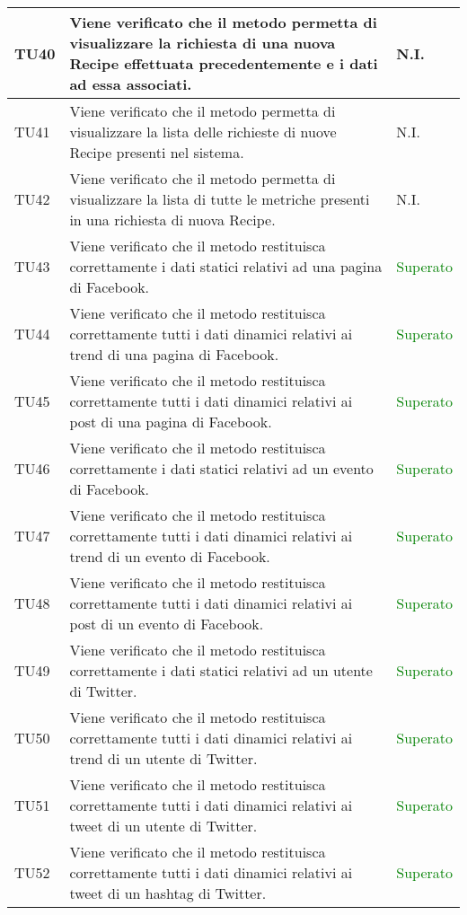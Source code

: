 \begin{center}
\begin{longtable}{| p{2cm} | p{8cm} | p{2.5cm} |}
					TU40 & Viene verificato che il metodo permetta di visualizzare la richiesta di una nuova Recipe effettuata precedentemente e i dati ad essa associati. & N.I.\\
					\hline
					TU41 & Viene verificato che il metodo permetta di visualizzare la lista delle richieste di nuove Recipe presenti nel sistema. & N.I.\\
					\hline
					TU42 & Viene verificato che il metodo permetta di visualizzare la lista di tutte le metriche presenti in una richiesta di nuova Recipe. & N.I.\\
					\hline
					TU43 & Viene verificato che il metodo restituisca correttamente i dati statici relativi ad una pagina di Facebook. & \textcolor{green}{Superato}\\
					\hline
					TU44 & Viene verificato che il metodo restituisca correttamente tutti i dati dinamici relativi ai trend di una pagina di Facebook. & \textcolor{green}{Superato}\\
					\hline
					TU45 & Viene verificato che il metodo restituisca correttamente tutti i dati dinamici relativi ai post di una pagina di Facebook. & \textcolor{green}{Superato}\\
					\hline
					TU46 & Viene verificato che il metodo restituisca correttamente i dati statici relativi ad un evento di Facebook. & \textcolor{green}{Superato}\\
					\hline
					TU47 & Viene verificato che il metodo restituisca correttamente tutti i dati dinamici relativi ai trend di un evento di Facebook. & \textcolor{green}{Superato}\\
					\hline
					TU48 & Viene verificato che il metodo restituisca correttamente tutti i dati dinamici relativi ai post di un evento di Facebook. & \textcolor{green}{Superato}\\
					\hline
					TU49 & Viene verificato che il metodo restituisca correttamente i dati statici relativi ad un utente di Twitter. & \textcolor{green}{Superato}\\
					\hline
					TU50 & Viene verificato che il metodo restituisca correttamente tutti i dati dinamici relativi ai trend di un utente di Twitter. & \textcolor{green}{Superato}\\
					\hline
					TU51 & Viene verificato che il metodo restituisca correttamente tutti i dati dinamici relativi ai tweet di un utente di Twitter. & \textcolor{green}{Superato}\\
					\hline
					TU52 & Viene verificato che il metodo restituisca correttamente tutti i dati dinamici relativi ai tweet di un hashtag di Twitter. & \textcolor{green}{Superato}\\

\end{longtable}
\end{center}
